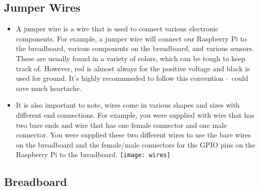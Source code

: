 \documentclass{article}\usepackage[]{graphicx}\usepackage[]{color}
\begin{document}
\subsection{Jumper Wires}

\begin{itemize}
\item A jumper wire is a wire that is used to connect various electronic components. For example, a jumper wire will connect our Raspberry Pi to the breadboard, various components on the breadboard, and various sensors. These are usually found in a variety of colors, which can be tough to keep track of. However, red is almost always for the positive voltage and black is used for ground. It's highly recommneded to follow this convention -- could save much heartache.
\item It is also important to note, wires come in various shapes and sizes with different end connections. For example, you were supplied with wire that has two bare ends and wire that has one female connector and one male connector. You were supplied these two different wires to use the bare wires on the breadboard and the female/male connectors for the GPIO pins on the Raspberry Pi to the breadboard.
\newline
\newline
\texttt{[image: wires]}
\end{itemize}

\subsection{Breadboard}
\end{document}
